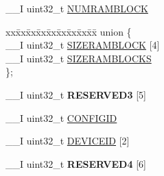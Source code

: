 \begin{DoxyCompactItemize}
\item 
\+\_\+\+\_\+\+I uint32\+\_\+t \hyperlink{struct_n_r_f___f_i_c_r___type_a763a3b3318fcf21bb14bff93082aacdd}{N\+U\+M\+R\+A\+M\+B\+L\+O\+C\+K}
\item 
\hypertarget{struct_n_r_f___f_i_c_r___type_a15db2fb5b406ec95d6bd33c22ee903e5}{}\begin{tabbing}
xx\=xx\=xx\=xx\=xx\=xx\=xx\=xx\=xx\=\kill
union \{\\
\>\_\_I uint32\_t \hyperlink{struct_n_r_f___f_i_c_r___type_a2fd553406ef3f6eead6bbe7def28e9f8}{SIZERAMBLOCK} \mbox{[}4\mbox{]}\\
\>\_\_I uint32\_t \hyperlink{struct_n_r_f___f_i_c_r___type_afb7c1966fe1dbedd16304a3b23ba6f7e}{SIZERAMBLOCKS}\\
\}; \label{struct_n_r_f___f_i_c_r___type_a15db2fb5b406ec95d6bd33c22ee903e5}
\\

\end{tabbing}\item 
\hypertarget{struct_n_r_f___f_i_c_r___type_ae853f5e0ef0b456221372927e92f7117}{}\+\_\+\+\_\+\+I uint32\+\_\+t {\bfseries R\+E\+S\+E\+R\+V\+E\+D3} \mbox{[}5\mbox{]}\label{struct_n_r_f___f_i_c_r___type_ae853f5e0ef0b456221372927e92f7117}

\item 
\+\_\+\+\_\+\+I uint32\+\_\+t \hyperlink{struct_n_r_f___f_i_c_r___type_a74d5c565adba5b4d0d8b4b64d44f7418}{C\+O\+N\+F\+I\+G\+I\+D}
\item 
\+\_\+\+\_\+\+I uint32\+\_\+t \hyperlink{struct_n_r_f___f_i_c_r___type_a86a505791377ca6b4c050f5fd3d8355d}{D\+E\+V\+I\+C\+E\+I\+D} \mbox{[}2\mbox{]}
\item 
\hypertarget{struct_n_r_f___f_i_c_r___type_a131faf5e9d951e51a0ef2bd969a40077}{}\+\_\+\+\_\+\+I uint32\+\_\+t {\bfseries R\+E\+S\+E\+R\+V\+E\+D4} \mbox{[}6\mbox{]}\label{struct_n_r_f___f_i_c_r___type_a131faf5e9d951e51a0ef2bd969a40077}


\end{DoxyCompactItemize}
